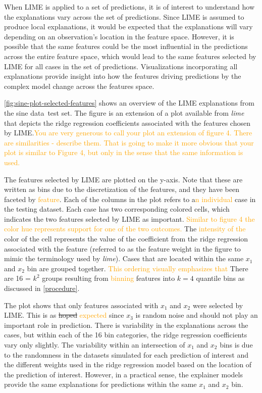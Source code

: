 \documentclass[AMS,STIX2COL]{WileyNJD-v2}\usepackage[]{graphicx}\usepackage[]{color}
\newcommand{\hh}[1]{\textcolor{orange}{#1}}
\newcommand{\data}{sine data}
\begin{document}
{When LIME is applied to a set of predictions, it is of interest to understand how the explanations vary across the set of predictions. Since LIME is assumed to produce local explanations, it would be expected that the explanations will vary depending on an observation's location in the feature space. However, it is possible that the same features could be the most influential in the predictions across the entire feature space, which would lead to the same features selected by LIME for all cases in the set of predictions. Visualizations incorporating all explanations provide insight into how the features driving predictions by the complex model change across the features space.

\autoref{fig:sine-plot-selected-features} shows an overview of the LIME explanations from the \data \ test set. The figure is an extension of a plot available from \emph{lime} that depicts the ridge regression coefficients associated with the features chosen by LIME.\hh{You are very generous to call your plot an extension of figure 4. There are similarities - describe them. That is going to make it more obvious that your plot is similar to Figure 4, but only in the sense that the same information is used.}

The features selected by LIME are plotted on the y-axis. Note that these are written as bins due to the discretization of the features, and they have been faceted by \hh{feature}. %
Each of the columns in the plot refers to a\hh{n individual} case in the testing dataset. Each case has two corresponding colored cells, which indicates the two features selected by LIME as important. \hh{Similar to figure 4 the color hue represents support for one of the two outcomes.} The \hh{intensity of the} color of the cell represents the value of the coefficient from the ridge regression associated with the feature (referred to as the feature weight in the figure to mimic the terminology used by \emph{lime}). Cases that are located within the same $x_1$ and $x_2$ bin are grouped together. \hh{This ordering visually emphasizes that} There are 16 = $k^2$ groups resulting from \hh{binning} features into $k=4$ quantile bins as discussed in \autoref{procedure}.

The plot shows that only features associated with $x_1$ and $x_2$ were selected by LIME. This is as \sout{hoped} \hh{expected} since $x_3$ is random noise and should not play an important role in prediction. There is variability in the explanations across the cases, but within each of the 16 bin categories, the ridge regression coefficients vary only slightly. The variability within an intersection of $x_1$ and $x_2$ bins is due to the randomness in the datasets simulated for each prediction of interest and the different weights used in the ridge regression model based on the location of the prediction of interest. However, in a practical sense, the explainer models provide the same explanations for predictions within the same $x_1$ and $x_2$ bin.

}
\end{document}

